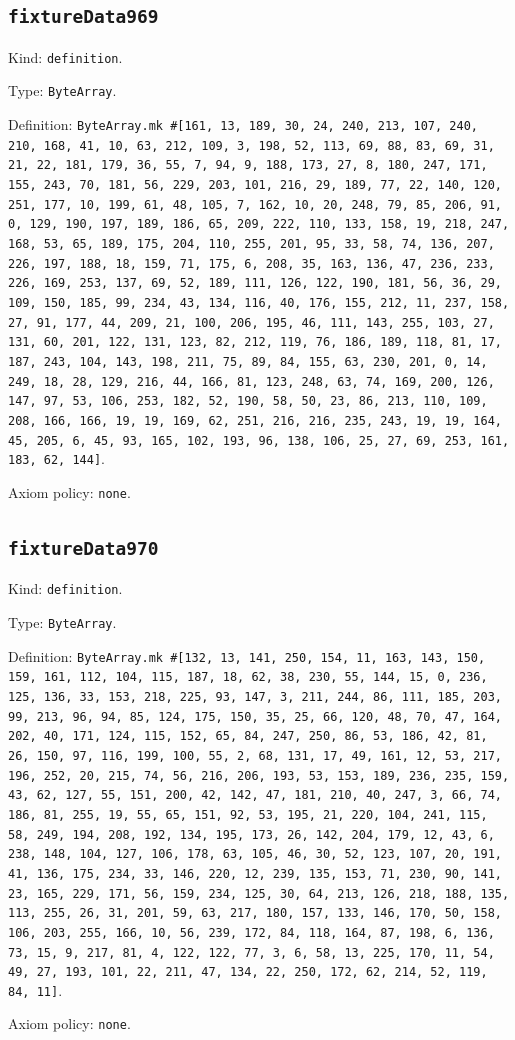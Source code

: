 \documentclass[11pt]{article}
\begin{document}
\subsection*{\texttt{fixtureData969}}
\noindent Kind: \texttt{definition}.\par
\noindent Type: \texttt{ByteArray}.\par
\noindent Definition: \texttt{ByteArray.mk \#[161, 13, 189, 30, 24, 240, 213, 107, 240, 210, 168, 41, 10, 63, 212, 109, 3, 198, 52, 113, 69, 88, 83, 69, 31, 21, 22, 181, 179, 36, 55, 7, 94, 9, 188, 173, 27, 8, 180, 247, 171, 155, 243, 70, 181, 56, 229, 203, 101, 216, 29, 189, 77, 22, 140, 120, 251, 177, 10, 199, 61, 48, 105, 7, 162, 10, 20, 248, 79, 85, 206, 91, 0, 129, 190, 197, 189, 186, 65, 209, 222, 110, 133, 158, 19, 218, 247, 168, 53, 65, 189, 175, 204, 110, 255, 201, 95, 33, 58, 74, 136, 207, 226, 197, 188, 18, 159, 71, 175, 6, 208, 35, 163, 136, 47, 236, 233, 226, 169, 253, 137, 69, 52, 189, 111, 126, 122, 190, 181, 56, 36, 29, 109, 150, 185, 99, 234, 43, 134, 116, 40, 176, 155, 212, 11, 237, 158, 27, 91, 177, 44, 209, 21, 100, 206, 195, 46, 111, 143, 255, 103, 27, 131, 60, 201, 122, 131, 123, 82, 212, 119, 76, 186, 189, 118, 81, 17, 187, 243, 104, 143, 198, 211, 75, 89, 84, 155, 63, 230, 201, 0, 14, 249, 18, 28, 129, 216, 44, 166, 81, 123, 248, 63, 74, 169, 200, 126, 147, 97, 53, 106, 253, 182, 52, 190, 58, 50, 23, 86, 213, 110, 109, 208, 166, 166, 19, 19, 169, 62, 251, 216, 216, 235, 243, 19, 19, 164, 45, 205, 6, 45, 93, 165, 102, 193, 96, 138, 106, 25, 27, 69, 253, 161, 183, 62, 144]}.\par
\noindent Axiom policy: \texttt{none}.\par
\subsection*{\texttt{fixtureData970}}
\noindent Kind: \texttt{definition}.\par
\noindent Type: \texttt{ByteArray}.\par
\noindent Definition: \texttt{ByteArray.mk \#[132, 13, 141, 250, 154, 11, 163, 143, 150, 159, 161, 112, 104, 115, 187, 18, 62, 38, 230, 55, 144, 15, 0, 236, 125, 136, 33, 153, 218, 225, 93, 147, 3, 211, 244, 86, 111, 185, 203, 99, 213, 96, 94, 85, 124, 175, 150, 35, 25, 66, 120, 48, 70, 47, 164, 202, 40, 171, 124, 115, 152, 65, 84, 247, 250, 86, 53, 186, 42, 81, 26, 150, 97, 116, 199, 100, 55, 2, 68, 131, 17, 49, 161, 12, 53, 217, 196, 252, 20, 215, 74, 56, 216, 206, 193, 53, 153, 189, 236, 235, 159, 43, 62, 127, 55, 151, 200, 42, 142, 47, 181, 210, 40, 247, 3, 66, 74, 186, 81, 255, 19, 55, 65, 151, 92, 53, 195, 21, 220, 104, 241, 115, 58, 249, 194, 208, 192, 134, 195, 173, 26, 142, 204, 179, 12, 43, 6, 238, 148, 104, 127, 106, 178, 63, 105, 46, 30, 52, 123, 107, 20, 191, 41, 136, 175, 234, 33, 146, 220, 12, 239, 135, 153, 71, 230, 90, 141, 23, 165, 229, 171, 56, 159, 234, 125, 30, 64, 213, 126, 218, 188, 135, 113, 255, 26, 31, 201, 59, 63, 217, 180, 157, 133, 146, 170, 50, 158, 106, 203, 255, 166, 10, 56, 239, 172, 84, 118, 164, 87, 198, 6, 136, 73, 15, 9, 217, 81, 4, 122, 122, 77, 3, 6, 58, 13, 225, 170, 11, 54, 49, 27, 193, 101, 22, 211, 47, 134, 22, 250, 172, 62, 214, 52, 119, 84, 11]}.\par
\noindent Axiom policy: \texttt{none}.\par
\end{document}
